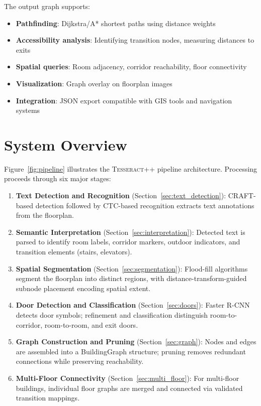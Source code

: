 \documentclass[manuscript,screen,review]{acmart}
\newcommand{\tesseract}{\textsc{Tesseract++}}
\begin{document}
The output graph supports:
\begin{itemize}
    \item \textbf{Pathfinding}: Dijkstra/A* shortest paths using distance weights
    \item \textbf{Accessibility analysis}: Identifying transition nodes, measuring distances to exits
    \item \textbf{Spatial queries}: Room adjacency, corridor reachability, floor connectivity
    \item \textbf{Visualization}: Graph overlay on floorplan images
    \item \textbf{Integration}: JSON export compatible with GIS tools and navigation systems
\end{itemize}

\section{System Overview}
\label{sec:system_overview}

Figure~\ref{fig:pipeline} illustrates the \tesseract{} pipeline architecture. Processing proceeds through six major stages:

\begin{enumerate}
    \item \textbf{Text Detection and Recognition} (Section~\ref{sec:text_detection}): CRAFT-based detection followed by CTC-based recognition extracts text annotations from the floorplan.
    
    \item \textbf{Semantic Interpretation} (Section~\ref{sec:interpretation}): Detected text is parsed to identify room labels, corridor markers, outdoor indicators, and transition elements (stairs, elevators).
    
    \item \textbf{Spatial Segmentation} (Section~\ref{sec:segmentation}): Flood-fill algorithms segment the floorplan into distinct regions, with distance-transform-guided subnode placement encoding spatial extent.
    
    \item \textbf{Door Detection and Classification} (Section~\ref{sec:doors}): Faster R-CNN detects door symbols; refinement and classification distinguish room-to-corridor, room-to-room, and exit doors.
    
    \item \textbf{Graph Construction and Pruning} (Section~\ref{sec:graph}): Nodes and edges are assembled into a BuildingGraph structure; pruning removes redundant connections while preserving reachability.
    
    \item \textbf{Multi-Floor Connectivity} (Section~\ref{sec:multi_floor}): For multi-floor buildings, individual floor graphs are merged and connected via validated transition mappings.
\end{enumerate}
\end{document}

